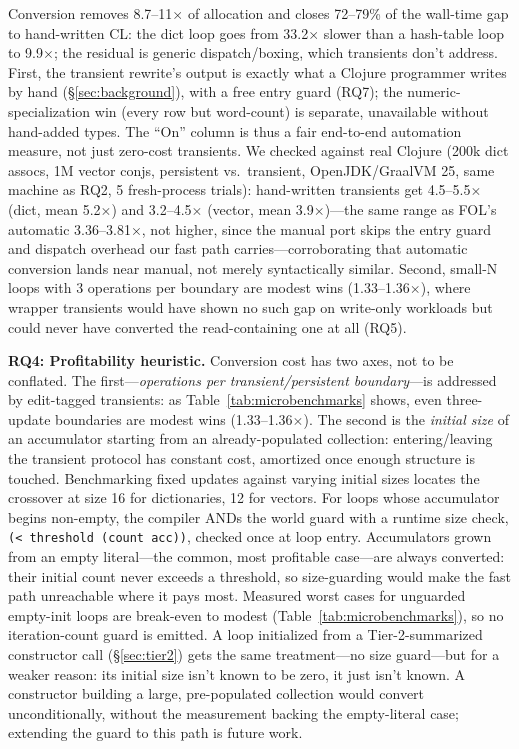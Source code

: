 \documentclass[sigplan,review,anonymous]{acmart}
\begin{document}
Conversion removes 8.7--11$\times$ of allocation and closes 72--79\% of the wall-time gap to hand-written CL: the dict loop goes from 33.2$\times$ slower than a hash-table loop to 9.9$\times$; the residual is generic dispatch/boxing, which transients don't address. First, the transient rewrite's output is exactly what a Clojure programmer writes by hand (§\ref{sec:background}), with a free entry guard (RQ7); the numeric-specialization win (every row but word-count) is separate, unavailable without hand-added types. The ``On'' column is thus a fair end-to-end automation measure, not just zero-cost transients. We checked against real Clojure (200k dict assocs, 1M vector conjs, persistent vs.\ transient, OpenJDK/GraalVM 25, same machine as RQ2, 5 fresh-process trials): hand-written transients get 4.5--5.5$\times$ (dict, mean 5.2$\times$) and 3.2--4.5$\times$ (vector, mean 3.9$\times$)---the same range as FOL's automatic 3.36--3.81$\times$, not higher, since the manual port skips the entry guard and dispatch overhead our fast path carries---corroborating that automatic conversion lands near manual, not merely syntactically similar. Second, small-N loops with 3 operations per boundary are modest wins (1.33--1.36$\times$), where wrapper transients would have shown no such gap on write-only workloads but could never have converted the read-containing one at all (RQ5).

\textbf{RQ4: Profitability heuristic.} Conversion cost has two axes, not to be conflated. The first---\emph{operations per transient/persistent boundary}---is addressed by edit-tagged transients: as Table~\ref{tab:microbenchmarks} shows, even three-update boundaries are modest wins (1.33--1.36$\times$). The second is the \emph{initial size} of an accumulator starting from an already-populated collection: entering/leaving the transient protocol has constant cost, amortized once enough structure is touched. Benchmarking fixed updates against varying initial sizes locates the crossover at size 16 for dictionaries, 12 for vectors. For loops whose accumulator begins non-empty, the compiler ANDs the world guard with a runtime size check, \texttt{(< threshold (count acc))}, checked once at loop entry. Accumulators grown from an empty literal---the common, most profitable case---are always converted: their initial count never exceeds a threshold, so size-guarding would make the fast path unreachable where it pays most. Measured worst cases for unguarded empty-init loops are break-even to modest (Table~\ref{tab:microbenchmarks}), so no iteration-count guard is emitted. A loop initialized from a Tier-2-summarized constructor call (§\ref{sec:tier2}) gets the same treatment---no size guard---but for a weaker reason: its initial size isn't known to be zero, it just isn't known. A constructor building a large, pre-populated collection would convert unconditionally, without the measurement backing the empty-literal case; extending the guard to this path is future work.
\end{document}
